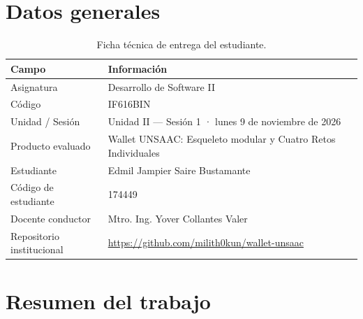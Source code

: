 \documentclass[12pt,a4paper]{article}
\begin{document}
\tableofcontents
\newpage

\section{Datos generales}

\begin{table}[h!]
\centering
\begin{tabular}{@{}ll@{}}
\toprule
\textbf{Campo} & \textbf{Información} \\
\midrule
Asignatura & Desarrollo de Software II \\
Código & IF616BIN \\
Unidad / Sesión & Unidad II — Sesión 1 · lunes 9 de noviembre de 2026 \\
Producto evaluado & Wallet UNSAAC: Esqueleto modular y Cuatro Retos Individuales \\
Estudiante & Edmil Jampier Saire Bustamante \\
Código de estudiante & 174449 \\
Docente conductor & Mtro. Ing. Yover Collantes Valer \\
Repositorio institucional & \url{https://github.com/milith0kun/wallet-unsaac} \\
\bottomrule
\end{tabular}
\caption{Ficha técnica de entrega del estudiante.}
\end{table}

\section{Resumen del trabajo}
\end{document}
